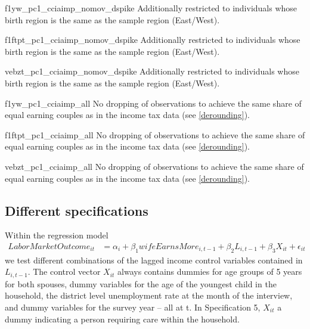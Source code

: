 \documentclass[a4paper,11pt]{scrartcl}
\begin{document}
\begin{appendix}
		\renewcommand{\samplenote}{Additionally restricted to individuals whose birth region is the same as the sample region (East/West).}

		{f1yw_pc1_cciaimp_nomov_dspike}%
		{\samplenote\,\specnote}

		{f1ftpt_pc1_cciaimp_nomov_dspike}%
		{\samplenote\,\specnote}

		{vebzt_pc1_cciaimp_nomov_dspike}%
		{\samplenote\,\specnote}


		\renewcommand{\samplenote}{No dropping of observations to achieve the same share of equal earning couples as in the income tax data (see \ref{derounding}).}

		{f1yw_pc1_cciaimp_all}%
		{\samplenote\,\specnote}

		{f1ftpt_pc1_cciaimp_all}%
		{\samplenote\,\specnote}

		{vebzt_pc1_cciaimp_all}%
		{\samplenote\,\specnote}

	\clearpage
	\subsection{Different specifications}
	\setcounter{table}{0}
	\setcounter{figure}{0}

		Within the regression model
		$$
		\begin{aligned}
		LaborMarketOutcome_{it} &= \alpha_i + \beta_1 wifeEarnsMore_{i,t-1} + \beta_2 L_{i,t-1} + \beta_3 X_{it} + \epsilon_{it}
		\end{aligned}
		$$
		we test different combinations of the lagged income control variables contained in $L_{i,t-1}$. The control vector $X_{it}$ always contains dummies for age groups of 5 years for both spouses, dummy variables for the age of the youngest child in the household, the district level unemployment rate at the month of the interview, and dummy variables for the survey year -- all at t. In Specification 5, $X_{it}$ a dummy indicating a person requiring care within the household.


\end{appendix}
\end{document}
